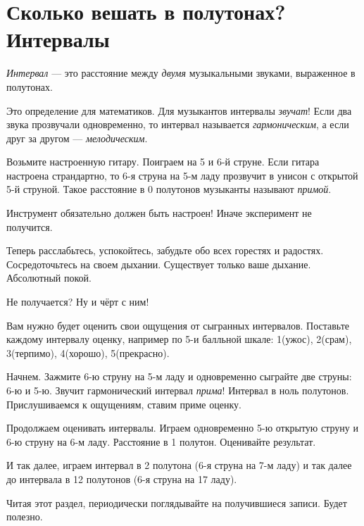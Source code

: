 \section{Сколько вешать в полутонах? Интервалы}
\label{ch:harmony:interval}

\begin{Definition}[Интервал]
    \emph{Интервал} --- это расстояние между \emph{двумя} музыкальными звуками, выраженное в полутонах. 
\end{Definition}

Это определение для математиков. Для музыкантов интервалы \emph{звучат}! Если два звука прозвучали одновременно, то интервал называется \emph{гармоническим}, а если друг за другом --- \emph{мелодическим}.

\begin{Example}
    \label{ex:harmony:interval:string5and6}
    Возьмите настроенную гитару. Поиграем на 5 и 6-й струне. Если гитара настроена страндартно, то 6-я струна на 5-м ладу прозвучит в унисон с открытой 5-й струной. Такое расстояние в 0 полутонов музыканты называют \emph{примой}. 
    
    Инструмент обязательно должен быть настроен! Иначе эксперимент не получится.
    
    Теперь расслабьтесь, успокойтесь, забудьте обо всех горестях и радостях. Сосредоточьтесь на своем дыхании. Существует только ваше дыхание. Абсолютный покой. 
    
    Не получается? Ну и чёрт с ним!

    Вам нужно будет оценить свои ощущения от сыгранных интервалов. Поставьте каждому интервалу оценку, например по 5-и балльной шкале: 1(ужос), 2(срам), 3(терпимо), 4(хорошо), 5(прекрасно).
    
    Начнем. Зажмите 6-ю струну на 5-м ладу и одновременно сыграйте две струны: 6-ю и 5-ю. Звучит гармонический интервал \emph{прима}! Интервал в ноль полутонов. Прислушиваемся к ощущениям, ставим приме оценку.
    
    Продолжаем оценивать интервалы. Играем одновременно 5-ю открытую струну и 6-ю струну на 6-м ладу. Расстояние в 1 полутон. Оценивайте результат.
    
    И так далее, играем интервал в 2 полутона (6-я струна на 7-м ладу) и так далее до интервала в 12 полутонов (6-я струна на 17 ладу). 
    
    Читая этот раздел, периодически поглядывайте на получившиеся записи. Будет полезно.
\end{Example}


